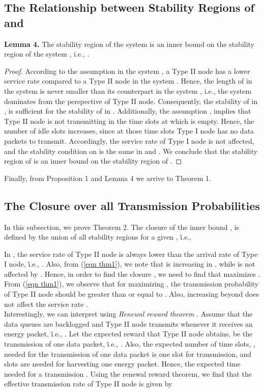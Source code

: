 \documentclass[draftcls,12pt,onecolumn]{IEEEtran}
\begin{document}
\subsection{The Relationship between Stability Regions of  and }\label{subsec: rel}
\indent \textbf{Lemma 4.} The stability region of the system  is an inner bound on the stability region of the system , i.e., .  
\begin{proof}
According to the assumption  in the system , a Type II node has a lower service rate compared to a Type II node in the system . Hence, the length of  in the system  is never smaller than its counterpart in the system , i.e., the system  dominates  from the perspective of Type II node. Consequently, the stability of  in , is sufficient for the stability of  in . Additionally, the assumption , implies that Type II node is not transmitting in the time slots at which  is empty. Hence, the number of idle slots increases, since at those time slots Type I node has no data packets to transmit. Accordingly, the service rate of Type I node is not affected, and the stability condition on  is the same in  and . We conclude that the stability region of  is an inner bound on the stability region of .
\end{proof}
Finally, from Proposition 1 and Lemma 4 we arrive to Theorem 1. 


\subsection{The Closure over all Transmission Probabilities}\label{subsec: closure}
In this subsection, we prove Theorem 2. The closure of the inner bound , is defined by the union of all stability regions for a given , \.i.e., 

In , the service rate of Type II node is always lower than the arrival rate of Type I node, \.i.e., . Also, from (\ref{eqn thm1}), we note that  is increasing in , while  is not affected by . Hence, in order to find the closure , we need to find  that maximizes . From (\ref{eqn thm1}), we observe that for maximizing , the transmission probability of Type II node  should be greater than or equal to . Also, increasing  beyond  does not affect the service rate .\\
\indent Interestingly, we can interpret  using \emph{Renewal reward theorem} \cite{ross1996stochastic}. Assume that the data queues are backlogged and Type II node transmits whenever it receives an energy packet, \.i.e., . Let the expected reward  that Type II node obtains, be the transmission of one data packet, \.i.e., . Also, the expected number of time slots, , needed for the transmission of one data packet is one slot for transmission, and  slots are needed for harvesting one energy packet. Hence, the expected time needed for a transmission . Using the renewal reward theorem, we find that the effective transmission rate of Type II node is given by 
\end{document}
